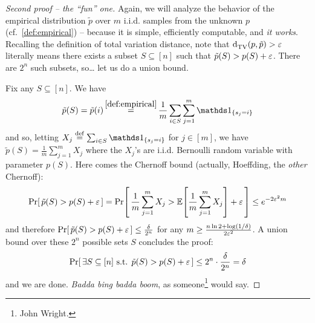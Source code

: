\documentclass[10pt]{article}
\begin{document}
\begin{proof}[Second proof -- the ``fun'' one]
Again, we will analyze the behavior of the empirical distribution $\tilde{p}$ over $m$ i.i.d. samples from the unknown $p$ (cf.~\eqref{def:empirical}) -- because it is simple, efficiently computable, and \emph{it works}.  Recalling the definition of total variation distance, note that ${\operatorname{d}_{\rm TV}^{}\!\left({p, \tilde{p}}\right)} > \varepsilon$ literally means there exists a subset $S\subseteq [n]$ such that $\tilde{p}(S) > p(S) + \varepsilon$. There are $2^n$ such subsets, so\dots{} let us do a union bound.

Fix any $S\subseteq[n]$. We have
\[
\tilde{p}(S) = \tilde{p}(i) \operatorname*{=}^{\eqref{def:empirical}} \frac{1}{m} \sum_{i\in S} \sum_{j=1}^m \indic{s_j=i}
\]
and so, letting $X_j \eqdef \sum_{i\in S}\indic{s_j=i}$ for $j\in [m]$, we have
$
\tilde{p}(S) = \frac{1}{m}\sum_{j=1}^m X_j
$ where the $X_j$'s are i.i.d. Bernoulli random variable with parameter $p(S)$. Here comes the Chernoff bound (actually, Hoeffding, the \emph{other} Chernoff):
\[
    \Pr\!\left[\,  \tilde{p}(S) > p(S) + \varepsilon \, \right] = \Pr\!\left[\,  \frac{1}{m}\sum_{j=1}^m X_j > \mathbb{E}\!\left[\frac{1}{m}\sum_{j=1}^m X_j\right] + \varepsilon \, \right] \leq e^{-2\varepsilon^2 m}
\]
and therefore $\Pr\!\left[\,  \tilde{p}(S) > p(S) + \varepsilon \, \right] \leq \frac{\delta}{2^n}$ for any $m\geq \frac{n\ln 2+\log(1/\delta)}{2\varepsilon^2}$. A union bound over these $2^n$ possible sets $S$ concludes the proof:
\[
    \Pr\!\left[\,  \exists S\subseteq [n] \text{ s.t. }\tilde{p}(S) > p(S) + \varepsilon \, \right] \leq 2^n\cdot \frac{\delta}{2^n} = \delta
\]
and we are done. \emph{Badda bing badda boom}, as someone\footnote{John Wright.} would say.
\end{proof}
\end{document}
